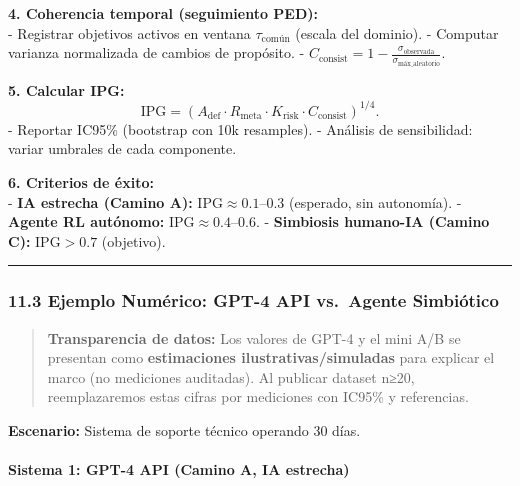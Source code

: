 \textbf{4. Coherencia temporal (seguimiento PED):}\\
- Registrar objetivos activos en ventana \(\tau_{\text{común}}\) (escala
del dominio). - Computar varianza normalizada de cambios de propósito. -
\(C_{\text{consist}} = 1 - \frac{\sigma_{\text{observada}}}{\sigma_{\text{máx\_aleatorio}}}\).

\textbf{5. Calcular IPG:}\\
\[
\mathrm{IPG} = \left(A_{\text{def}} \cdot R_{\text{meta}} \cdot K_{\text{risk}} \cdot C_{\text{consist}}\right)^{1/4}.
\] - Reportar IC95\% (bootstrap con 10k resamples). - Análisis de
sensibilidad: variar umbrales de cada componente.

\textbf{6. Criterios de éxito:}\\
- \textbf{IA estrecha (Camino A):} \(\mathrm{IPG} \approx 0.1\)--0.3
(esperado, sin autonomía). - \textbf{Agente RL autónomo:}
\(\mathrm{IPG} \approx 0.4\)--0.6. - \textbf{Simbiosis humano-IA (Camino
C):} \(\mathrm{IPG} > 0.7\) (objetivo).

\begin{center}\rule{0.5\linewidth}{0.5pt}\end{center}

\subsubsection{11.3 Ejemplo Numérico: GPT-4 API vs.~Agente
Simbiótico}\label{ejemplo-numuxe9rico-gpt-4-api-vs.-agente-simbiuxf3tico}

\begin{quote}
\textbf{Transparencia de datos:} Los valores de GPT-4 y el mini A/B se
presentan como \textbf{estimaciones ilustrativas/simuladas} para
explicar el marco (no mediciones auditadas). Al publicar dataset n≥20,
reemplazaremos estas cifras por mediciones con IC95\% y referencias.
\end{quote}

\textbf{Escenario:} Sistema de soporte técnico operando 30 días.

\paragraph{\texorpdfstring{\textbf{Sistema 1: GPT-4 API (Camino A, IA
estrecha)}}{Sistema 1: GPT-4 API (Camino A, IA estrecha)}}\label{sistema-1-gpt-4-api-camino-a-ia-estrecha}

